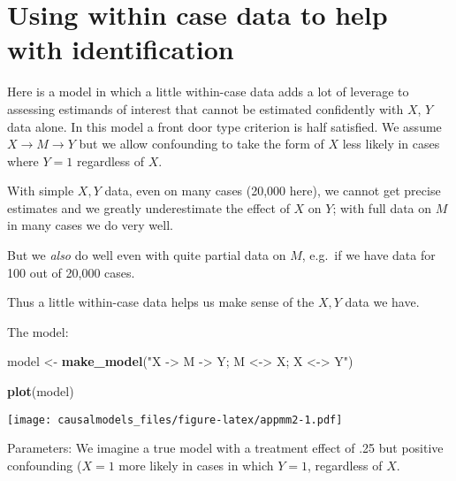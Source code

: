 \documentclass[
  12pt,
]{book}
\newenvironment{Shaded}{\begin{snugshade}}{\end{snugshade}}
\newcommand{\FunctionTok}[1]{\textcolor[rgb]{0.13,0.29,0.53}{\textbf{#1}}}
\newcommand{\NormalTok}[1]{#1}
\newcommand{\OtherTok}[1]{\textcolor[rgb]{0.56,0.35,0.01}{#1}}
\newcommand{\StringTok}[1]{\textcolor[rgb]{0.31,0.60,0.02}{#1}}
\begin{document}
\hypertarget{using-within-case-data-to-help-with-identification}{%
\section{Using within case data to help with identification}\label{using-within-case-data-to-help-with-identification}}

Here is a model in which a little within-case data adds a lot of leverage to assessing estimands of interest that cannot be estimated confidently with \(X\), \(Y\) data alone. In this model a front door type criterion is half satisfied. We assume \(X\rightarrow M \rightarrow Y\) but we allow confounding to take the form of \(X\) less likely in cases where \(Y=1\) regardless of \(X\).

With simple \(X,Y\) data, even on many cases (20,000 here), we cannot get precise estimates and we greatly underestimate the effect of \(X\) on \(Y\); with full data on \(M\) in many cases we do very well.

But we \emph{also} do well even with quite partial data on \(M\), e.g.~if we have data for 100 out of 20,000 cases.

Thus a little within-case data helps us make sense of the \(X,Y\) data we have.

The model:

\begin{Shaded}
\begin{Highlighting}[]
\NormalTok{model }\OtherTok{\textless{}{-}} 
  \FunctionTok{make\_model}\NormalTok{(}\StringTok{"X {-}\textgreater{} M {-}\textgreater{} Y; M \textless{}{-}\textgreater{} X; X \textless{}{-}\textgreater{} Y"}\NormalTok{) }

\FunctionTok{plot}\NormalTok{(model)}
\end{Highlighting}
\end{Shaded}

\texttt{[image: causalmodels\_files/figure-latex/appmm2-1.pdf]}

Parameters: We imagine a true model with a treatment effect of .25 but positive confounding (\(X=1\) more likely in cases in which \(Y=1\), regardless of \(X\).
\end{document}
